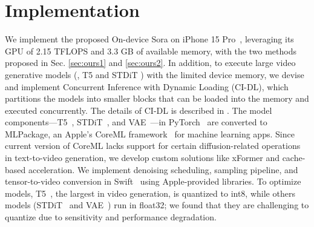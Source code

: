 \section{Implementation}

We implement the proposed On-device Sora on iPhone 15 Pro~\cite{apple2023}, leveraging its GPU of 2.15 TFLOPS and 3.3 GB of available memory, with the two methods proposed in Sec. \ref{sec:ours1} and \ref{sec:ours2}. In addition, to execute large video generative models (\ie, T5 \cite{raffel2020exploring} and STDiT \cite{opensora}) with the limited device memory, we devise and implement Concurrent Inference with Dynamic Loading (CI-DL), which partitions the models into smaller blocks that can be loaded into the memory and executed concurrently. The details of CI-DL is described in . The model components—T5~\cite{raffel2020exploring}, STDiT~\cite{opensora}, and VAE~\cite{doersch2016tutorial}—in PyTorch~\cite{paszke2019pytorch} are converted to MLPackage, an Apple’s CoreML framework~\cite{sahin2021introduction} for machine learning apps. Since current version of CoreML \cite{apple2023} lacks support for certain diffusion-related operations in text-to-video generation, we develop custom solutions like xFormer \cite{xFormers2022} and cache-based acceleration. We implement denoising scheduling, sampling pipeline, and tensor-to-video conversion in Swift~\cite{swift} using Apple-provided libraries. To optimize models, T5~\cite{raffel2020exploring}, the largest in video generation, is quantized to int8, while others models  (STDiT~\cite{opensora} and VAE~\cite{doersch2016tutorial}) run in float32; we found that they are challenging to quantize due to sensitivity and performance degradation.%

